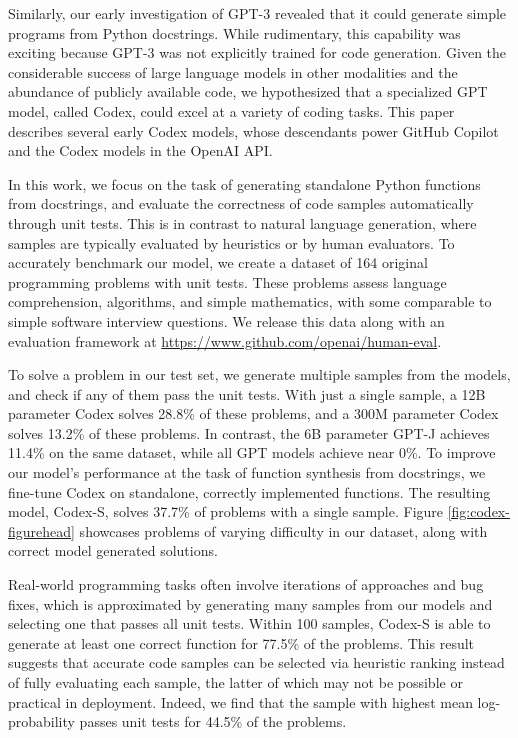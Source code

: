 Similarly, our early investigation of GPT-3 \citep{brown2020gpt3} revealed that it could generate simple programs from Python docstrings. While rudimentary, this capability was exciting because GPT-3 was not explicitly trained for code generation. Given the considerable success of large language models in other modalities and the abundance of publicly available code, we hypothesized that a specialized GPT model, called Codex, could excel at a variety of coding tasks. This paper describes several early Codex models, whose descendants power GitHub Copilot and the Codex models in the OpenAI API.

In this work, we focus on the task of generating standalone Python functions from docstrings, and evaluate the correctness of code samples automatically through unit tests. This is in contrast to natural language generation, where samples are typically evaluated by heuristics or by human evaluators. To accurately benchmark our model, we create a dataset of 164 original programming problems with unit tests. These problems assess language comprehension, algorithms, and simple mathematics, with some comparable to simple software interview questions. We release this data along with an evaluation framework at \href{https://www.github.com/openai/human-eval}{https://www.github.com/openai/human-eval}.

To solve a problem in our test set, we generate multiple samples from the models, and check if any of them pass the unit tests. With just a single sample, a 12B parameter Codex solves 28.8\% of these problems, and a 300M parameter Codex solves 13.2\% of these problems. In contrast, the 6B parameter GPT-J \cite{gpt-j} achieves 11.4\% on the same dataset, while all GPT models achieve near 0\%. To improve our model's performance at the task of function synthesis from docstrings, we fine-tune Codex on standalone, correctly implemented functions. The resulting model, Codex-S, solves 37.7\% of problems with a single sample. Figure \ref{fig:codex-figurehead} showcases problems of varying difficulty in our dataset, along with correct model generated solutions.

Real-world programming tasks often involve iterations of approaches and bug fixes, which is approximated by generating many samples from our models and selecting one that passes all unit tests. Within 100 samples, Codex-S is able to generate at least one correct function for 77.5\% of the problems. This result suggests that accurate code samples can be selected via heuristic ranking instead of fully evaluating each sample, the latter of which may not be possible or practical in deployment. Indeed, we find that the sample with highest mean log-probability passes unit tests for 44.5\% of the problems. 

